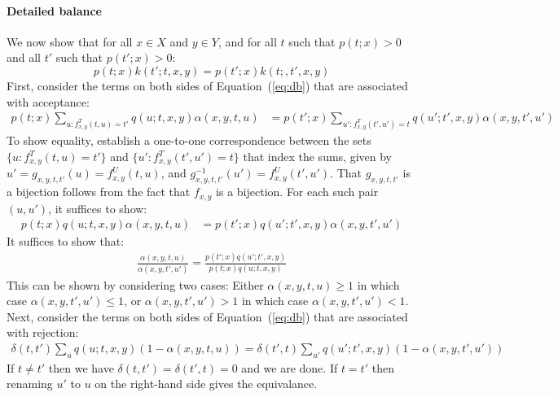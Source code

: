 \documentclass{article}
\begin{document}
\paragraph{Detailed balance}
We now show that for all $x \in X$ and $y \in Y$, and for all $t$ such that $p(t; x) > 0$ and all $t'$ such that $p(t'; x) > 0$:
\begin{equation} \label{eq:db}
p(t; x) k(t'; t, x, y) = p(t'; x) k(t;, t', x, y)
\end{equation}
First, consider the terms on both sides of Equation~(\ref{eq:db}) that are associated with acceptance:
\begin{align}
p(t; x) \sum_{u : f^T_{x,y}(t, u) = t'} q(u; t, x, y) \alpha(x, y, t, u) &= p(t'; x) \sum_{u' : f^T_{x,y}(t', u') = t} q(u'; t', x, y) \alpha(x, y, t', u')
\end{align}
To show equality, establish a one-to-one correspondence between the sets $\{u : f^T_{x,y}(t, u) = t'\}$ and $\{u' : f^T_{x,y}(t', u') = t\}$ that index the sums, given by $u' = g_{x,y,t,t'}(u) = f^U_{x,y}(t, u)$, and $g_{x,y,t,t'}^{-1}(u') = f_{x,y}^U(t', u')$.
That $g_{x,y,t,t'}$ is a bijection follows from the fact that $f_{x,y}$ is a bijection.
For each such pair $(u, u')$, it suffices to show:
\begin{align}
p(t; x) q(u; t, x, y) \alpha(x, y, t, u) &= p(t'; x) q(u'; t', x, y) \alpha(x, y, t', u')
\end{align}
It suffices to show that:
\begin{align}
    \frac{\alpha(x, y, t, u)}{\alpha(x, y, t', u')} = \frac{p(t'; x) q(u'; t', x, y)}{p(t; x) q(u; t, x, y)}
\end{align}
This can be shown by considering two cases: Either $\alpha(x, y, t, u) \ge 1$ in which case $\alpha(x, y, t', u') \le 1$, or $\alpha(x, y, t', u') > 1$ in which case $\alpha(x, y, t', u') < 1$.
Next, consider the terms on both sides of Equation~(\ref{eq:db}) that are associated with rejection:
\begin{align}
    \delta(t, t') \sum_u q(u; t, x, y) (1 - \alpha(x, y, t, u)) = \delta(t', t) \sum_{u'} q(u'; t', x, y) (1 - \alpha(x, y, t', u'))
\end{align}
If $t \ne t'$ then we have $\delta(t, t') = \delta(t', t) = 0$ and we are done.
If $t = t'$ then renaming $u'$ to $u$ on the right-hand side gives the equivalance.
\end{document}
